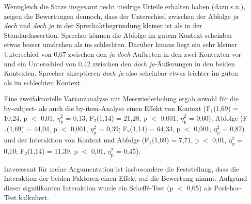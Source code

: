 Wenngleich die Sätze insgesamt recht niedrige Urteile erhalten haben (dazu s.u.), zeigen die Bewertungen dennoch, dass der Unterschied zwischen der Abfolge \textit{ja doch} und \textit{doch ja} in der Sprechaktbegründung  kleiner ist als in der  Standardassertion. Sprecher können die Abfolge im gutem Kontext scheinbar etwas besser umdrehen als im schlechten. Darüber hinaus liegt ein sehr kleiner Unterschied von 0,07 zwischen den \textit{ja doch}-Auftreten in den zwei Kontexten vor und ein Unterschied von 0,42 zwischen den \textit{doch ja}-Äußerungen in den beiden Kontexten. Sprecher akzeptieren \textit{doch ja} also scheinbar etwas leichter im guten als im schlechten Kontext.

Eine zweifaktorielle Varianzanalyse mit Messwiederholung ergab sowohl für die by-subject- als auch die by-item-Analyse einen Effekt von \glqq Kontext\grqq{} (F$_{1}$(1,69) = 10,24, p $<$ 0,01, $\eta_{\textrm{p}}^{2}$ = 0,13; F$_{2}$(1,14) = 21,28, p $<$ 0,001, $\eta_{\textrm{p}}^{2}$ = 0,60), \glqq Abfolge\grqq{} (F$_{1}$(1,69) = 44,04, p $<$ 0,001, $\eta_{\textrm{p}}^{2}$ = 0,39; F$_{2}$(1,14) = 64,33, p $<$ 0,001, $\eta_{\textrm{p}}^{2}$ = 0,82) und der Interaktion von \glqq Kontext\grqq{} und \glqq Abfolge\grqq{} (F$_{1}$(1,69) = 7,71, p $<$ 0,01, $\eta_{\textrm{p}}^{2}$ = 0,10; F$_{2}$(1,14) = 11,39, p $<$ 0,01, 
$\eta_{\textrm{p}}^{2}$ = 0,45).

Interessant für meine Argumentation ist insbesondere die Feststellung, dass die Interaktion der beiden Faktoren einen Effekt auf die Bewertung nimmt. Aufgrund dieser signifikanten Interaktion wurde ein Scheff\'{e}-Test (p $<$ 0,05) als Post-hoc-Test kalkuliert. 

